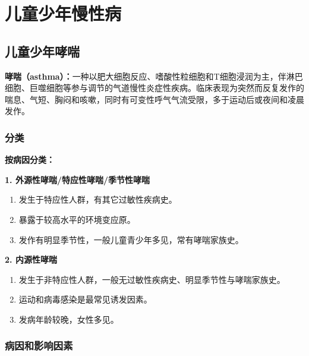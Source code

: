 \chapter{儿童少年慢性病}
\setcounter{chapter}{8}

\section{儿童少年哮喘}

\begin{defbox}
\textbf{哮喘（asthma）：}一种以肥大细胞反应、嗜酸性粒细胞和T细胞浸润为主，伴淋巴细胞、巨噬细胞等参与调节的气道慢性炎症性疾病。临床表现为突然而反复发作的喘息、气短、胸闷和咳嗽，同时有可变性呼气气流受限，多于运动后或夜间和凌晨发作。
\end{defbox}

\subsection{分类}

\begin{keybox}
\textbf{按病因分类：}

\textbf{1. 外源性哮喘/特应性哮喘/季节性哮喘}
\begin{enumerate}[leftmargin=*]
    \item 发生于特应性人群，有其它过敏性疾病史。
    \item 暴露于较高水平的环境变应原。
    \item 发作有明显季节性，一般儿童青少年多见，常有哮喘家族史。
\end{enumerate}

\textbf{2. 内源性哮喘}
\begin{enumerate}[leftmargin=*]
    \item 发生于非特应性人群，一般无过敏性疾病史、明显季节性与哮喘家族史。
    \item 运动和病毒感染是最常见诱发因素。
    \item 发病年龄较晚，女性多见。
\end{enumerate}
\end{keybox}

\subsection{病因和影响因素}

